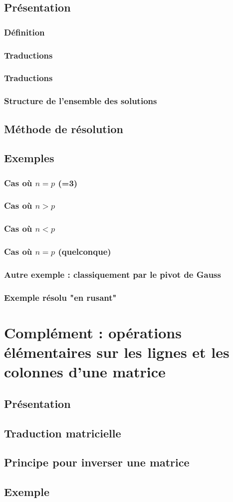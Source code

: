 \documentclass[12pt,a4paper,french]{book}
\begin{document}
	\section{Présentation}
		\subsection{Définition}
		\subsection{Traductions}
		\subsection{Traductions}
		\subsection{Structure de l'ensemble des solutions}
	\section{Méthode de résolution}
	\section{Exemples}
		\subsection{Cas où $n=p$ (=3)}
		\subsection{Cas où $n>p$}
		\subsection{Cas où $n<p$}
		\subsection{Cas où $n=p$ (quelconque)}
		\subsection{Autre exemple : classiquement par le pivot de Gauss}
		\subsection{Exemple résolu "en rusant"}
		
\chapter{Complément : opérations élémentaires sur les lignes et les colonnes d'une matrice}
	\section{Présentation}
	\section{Traduction matricielle}
	\section{Principe pour inverser une matrice}
	\section{Exemple}

	
	
\end{document}
